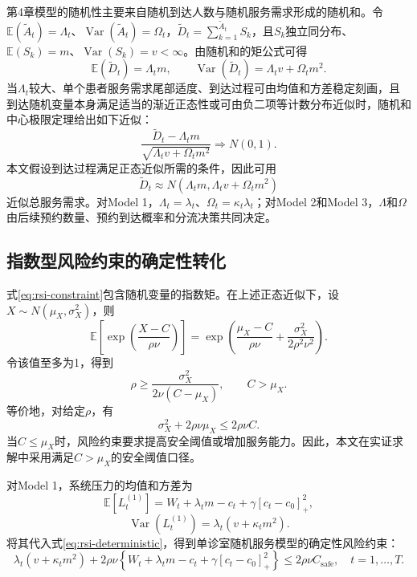\documentclass[a4paper,zihao=-4]{ctexart}
\newcommand{\E}{\mathbb{E}}
\newcommand{\Var}{\operatorname{Var}}
\numberwithin{figure}{section}
\numberwithin{table}{section}
\begin{document}
第4章模型的随机性主要来自随机到达人数与随机服务需求形成的随机和。令$\E(\tilde A_t)=\Lambda_t$、$\Var(\tilde A_t)=\Omega_t$，$\tilde D_t=\sum_{k=1}^{\tilde A_t}S_k$，且$S_k$独立同分布、$\E(S_k)=m$、$\Var(S_k)=v<\infty$。由随机和的矩公式可得
\begin{equation}
\E(\tilde D_t)=\Lambda_t m,\qquad
\Var(\tilde D_t)=\Lambda_t v+\Omega_t m^2.
\end{equation}
当$\Lambda_t$较大、单个患者服务需求尾部适度、到达过程可由均值和方差稳定刻画，且到达随机变量本身满足适当的渐近正态性或可由负二项等计数分布近似时，随机和中心极限定理给出如下近似\citep{Ross2014}：
\begin{equation}
\frac{\tilde D_t-\Lambda_t m}{\sqrt{\Lambda_t v+\Omega_t m^2}}
\Rightarrow N(0,1).
\label{eq:compound-clt}
\end{equation}
本文假设到达过程满足正态近似所需的条件，因此可用
\begin{equation}
\tilde D_t\approx N\left(\Lambda_t m,\Lambda_t v+\Omega_t m^2\right)
\end{equation}
近似总服务需求。对Model 1，$\Lambda_t=\lambda_t$、$\Omega_t=\kappa_t\lambda_t$；对Model 2和Model 3，$\Lambda$和$\Omega$由后续预约数量、预约到达概率和分流决策共同决定。

\subsection{指数型风险约束的确定性转化}

式\eqref{eq:rsi-constraint}包含随机变量的指数矩。在上述正态近似下，设$X\sim N(\mu_X,\sigma_X^2)$，则
\begin{equation}
\E\left[\exp\left(\frac{X-C}{\rho\nu}\right)\right]
=\exp\left(\frac{\mu_X-C}{\rho\nu}+\frac{\sigma_X^2}{2\rho^2\nu^2}\right).
\end{equation}
令该值至多为1，得到
\begin{equation}
\rho \geq \frac{\sigma_X^2}{2\nu(C-\mu_X)},\qquad C>\mu_X.
\label{eq:normal-rsi}
\end{equation}
等价地，对给定$\rho$，有
\begin{equation}
\sigma_X^2+2\rho\nu\mu_X\leq 2\rho\nu C.
\label{eq:rsi-deterministic}
\end{equation}
当$C\leq\mu_X$时，风险约束要求提高安全阈值或增加服务能力。因此，本文在实证求解中采用满足$C>\mu_X$的安全阈值口径。

对Model 1，系统压力的均值和方差为
\begin{equation}
\E[L_t^{(1)}]=W_t+\lambda_t m-c_t+\gamma[c_t-c_0]_+^2,
\end{equation}
\begin{equation}
\Var(L_t^{(1)})=\lambda_t(v+\kappa_t m^2).
\end{equation}
将其代入式\eqref{eq:rsi-deterministic}，得到单诊室随机服务模型的确定性风险约束：
\begin{equation}
\lambda_t(v+\kappa_t m^2)
 +2\rho\nu\left\{W_t+\lambda_t m-c_t+\gamma[c_t-c_0]_+^2\right\}
\leq 2\rho\nu C_{\mathrm{safe}},
\quad t=1,\ldots,T.
\label{eq:model1-deterministic-rsi}
\end{equation}
\end{document}
